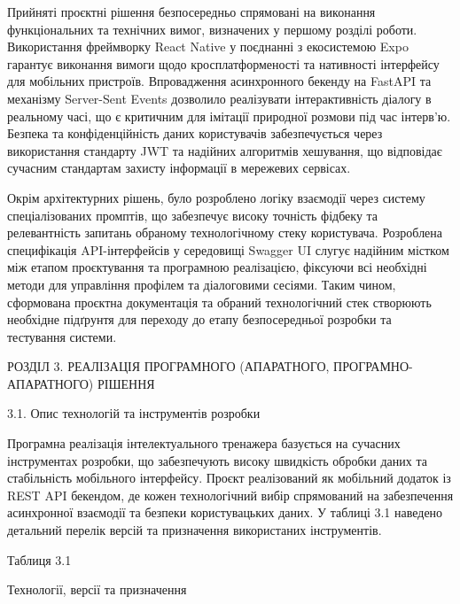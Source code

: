 Прийняті проєктні рішення безпосередньо спрямовані на виконання
функціональних та технічних вимог, визначених у першому розділі роботи.
Використання фреймворку React Native у поєднанні з екосистемою Expo
гарантує виконання вимоги щодо кросплатформеності та нативності
інтерфейсу для мобільних пристроїв. Впровадження асинхронного бекенду на
FastAPI та механізму Server-Sent Events дозволило реалізувати
інтерактивність діалогу в реальному часі, що є критичним для імітації
природної розмови під час інтерв'ю. Безпека та конфіденційність даних
користувачів забезпечується через використання стандарту JWT та надійних
алгоритмів хешування, що відповідає сучасним стандартам захисту
інформації в мережевих сервісах.

Окрім архітектурних рішень, було розроблено логіку взаємодії через
систему спеціалізованих промптів, що забезпечує високу точність фідбеку
та релевантність запитань обраному технологічному стеку користувача.
Розроблена специфікація API-інтерфейсів у середовищі Swagger UI слугує
надійним містком між етапом проєктування та програмною реалізацією,
фіксуючи всі необхідні методи для управління профілем та діалоговими
сесіями. Таким чином, сформована проєктна документація та обраний
технологічний стек створюють необхідне підґрунтя для переходу до етапу
безпосередньої розробки та тестування системи.

РОЗДІЛ 3. РЕАЛІЗАЦІЯ ПРОГРАМНОГО (АПАРАТНОГО, ПРОГРАМНО-АПАРАТНОГО)
РІШЕННЯ

3.1. Опис технологій та інструментів розробки

Програмна реалізація інтелектуального тренажера базується на сучасних
інструментах розробки, що забезпечують високу швидкість обробки даних та
стабільність мобільного інтерфейсу. Проєкт реалізований як мобільний
додаток із REST API бекендом, де кожен технологічний вибір спрямований
на забезпечення асинхронної взаємодії та безпеки користувацьких даних. У
таблиці 3.1 наведено детальний перелік версій та призначення
використаних інструментів.

Таблиця 3.1

Технології, версії та призначення

